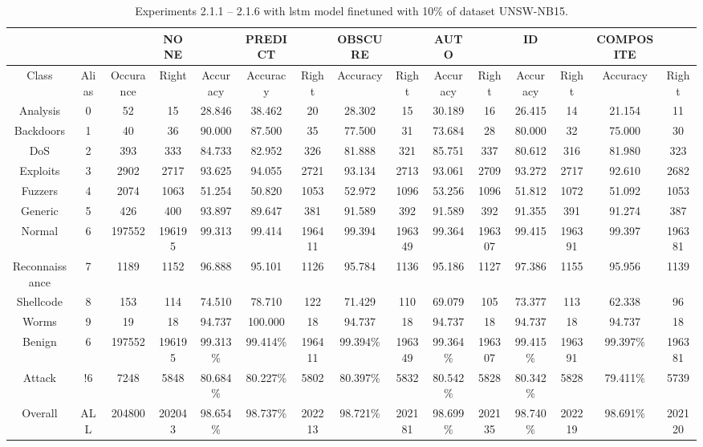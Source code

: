 \begin{table}[htb]
    \centering
    \caption{Experiments 2.1.1 – 2.1.6 with \gls{lstm} model finetuned with 10\% of dataset UNSW-NB15.}
    \label{table:results:lstm:flows15_10}
    \begin{tabular}{@{}ccccccccccccccc@{}}
        \toprule
         &  &  & NONE &  & PREDICT &  & OBSCURE &  & AUTO &  & ID &  & COMPOSITE &  \\
        \midrule
        Class &  Alias &  Occurance &  Right &  Accuracy &  Accuracy &  Right &  Accuracy &  Right &  Accuracy &  Right &  Accuracy &  Right &  Accuracy &  Right \\
        Analysis &  0 &  52 &  15 &  28.846 &  38.462 &  20 &  28.302 &  15 &  30.189 &  16 &  26.415 &  14 &  21.154 &  11 \\
        Backdoors &  1 &  40 &  36 &  90.000 &  87.500 &  35 &  77.500 &  31 &  73.684 &  28 &  80.000 &  32 &  75.000 &  30 \\
        DoS &  2 &  393 &  333 &  84.733 &  82.952 &  326 &  81.888 &  321 &  85.751 &  337 &  80.612 &  316 &  81.980 &  323 \\
        Exploits &  3 &  2902 &  2717 &  93.625 &  94.055 &  2721 &  93.134 &  2713 &  93.061 &  2709 &  93.272 &  2717 &  92.610 &  2682 \\
        Fuzzers &  4 &  2074 &  1063 &  51.254 &  50.820 &  1053 &  52.972 &  1096 &  53.256 &  1096 &  51.812 &  1072 &  51.092 &  1053 \\
        Generic &  5 &  426 &  400 &  93.897 &  89.647 &  381 &  91.589 &  392 &  91.589 &  392 &  91.355 &  391 &  91.274 &  387 \\
        Normal &  6 &  197552 &  196195 &  99.313 &  99.414 &  196411 &  99.394 &  196349 &  99.364 &  196307 &  99.415 &  196391 &  99.397 &  196381 \\
        Reconnaissance &  7 &  1189 &  1152 &  96.888 &  95.101 &  1126 &  95.784 &  1136 &  95.186 &  1127 &  97.386 &  1155 &  95.956 &  1139 \\
        Shellcode &  8 &  153 &  114 &  74.510 &  78.710 &  122 &  71.429 &  110 &  69.079 &  105 &  73.377 &  113 &  62.338 &  96 \\
        Worms &  9 &  19 &  18 &  94.737 &  100.000 &  18 &  94.737 &  18 &  94.737 &  18 &  94.737 &  18 &  94.737 &  18 \\
        Benign &  6 &  197552 &  196195 &  99.313\% &  99.414\% &  196411 &  99.394\% &  196349 &  99.364\% &  196307 &  99.415\% &  196391 &  99.397\% &  196381 \\
        Attack &  !6 &  7248 &  5848 &  80.684\% &  80.227\% &  5802 &  80.397\% &  5832 &  80.542\% &  5828 &  80.342\% &  5828 &  79.411\% &  5739 \\
        Overall &  ALL &  204800 &  202043 &  98.654\% &  98.737\% &  202213 &  98.721\% &  202181 &  98.699\% &  202135 &  98.740\% &  202219 &  98.691\% &  202120 \\
        \bottomrule
    \end{tabular}
\end{table}